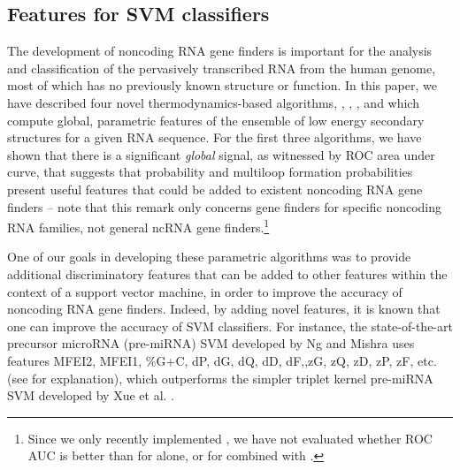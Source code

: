 \subsection*{Features for SVM classifiers}

The development of noncoding RNA gene finders is important for the
analysis and classification of the pervasively transcribed
RNA from the human genome, most of which has no previously known
structure or function.  In this paper, we have described
four novel thermodynamics-based algorithms, {\rnahairpin},
{\rnamlnumber}, {\rnamlorder}, and {\rnahairpinml} which
compute global, parametric features of the ensemble
of low energy secondary structures for a
given RNA sequence. For the first three algorithms, we have
shown that there is a significant {\em global} signal, as witnessed
by ROC area under curve, that suggests that probability and multiloop
formation probabilities present useful features that could be added
to existent noncoding RNA gene finders -- note that this remark only
concerns gene finders for specific noncoding RNA families, not general
ncRNA gene finders.\footnote{Since we only recently implemented
{\rnahairpinml}, we have not evaluated whether ROC AUC is better than
for {\rnahairpin} alone, or for {\rnahairpin} combined with {\rnamlnumber}.}

One of our goals in developing these parametric algorithms
was to provide additional discriminatory features that
can be added to other features within the context of
a support vector machine, in order to improve the accuracy of
noncoding RNA gene finders. Indeed, by adding novel features,
it is known that one can improve the accuracy of SVM classifiers.
For instance, the state-of-the-art precursor
microRNA (pre-miRNA) SVM developed by Ng and Mishra
\citep{Ng.b07} uses features
MFEI2, MFEI1, \%G+C, dP, dG, dQ, dD, dF,,zG, zQ, zD, zP, zF, etc.
(see \citep{Ng.b07} for explanation), which outperforms
the simpler
triplet kernel pre-miRNA SVM developed by Xue et al. \citep{Xue.bb05}.
